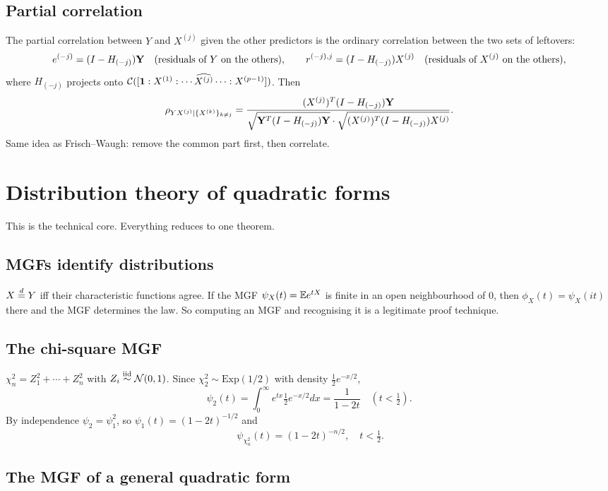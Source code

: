 \documentclass[11pt]{article}
\begin{document}
\subsection{Partial correlation}

The partial correlation between $Y$ and $X^{(j)}$ given the other predictors is the ordinary
correlation between the two sets of leftovers:
\[
  e^{(-j)}=(I-H_{(-j)})\mathbf{Y} \quad\text{(residuals of $Y$ on the others)},\qquad
  r^{(-j),j}=(I-H_{(-j)})X^{(j)} \quad\text{(residuals of $X^{(j)}$ on the others)},
\]
where $H_{(-j)}$ projects onto $\mathcal{C}([\mathbf{1}:X^{(1)}:\cdots\widehat{X^{(j)}}\cdots:X^{(p-1)}])$. Then
\[
  \rho_{Y X^{(j)}\mid \{X^{(k)}\}_{k\ne j}}
  =\frac{(X^{(j)})^T(I-H_{(-j)})\mathbf{Y}}
        {\sqrt{\mathbf{Y}^T(I-H_{(-j)})\mathbf{Y}}\cdot\sqrt{(X^{(j)})^T(I-H_{(-j)})X^{(j)}}} .
\]
Same idea as Frisch--Waugh: remove the common part first, then correlate.

\section{Distribution theory of quadratic forms}

This is the technical core. Everything reduces to one theorem.

\subsection{MGFs identify distributions}

$X\overset{d}{=} Y$ iff their characteristic functions agree. If the MGF
$\psi_X(t)=\mathbb{E} e^{tX}$ is finite in an open neighbourhood of $0$, then
$\phi_X(t)=\psi_X(it)$ there and the MGF determines the law. So computing an MGF and
recognising it is a legitimate proof technique.

\subsection{The chi-square MGF}

$\chi^2_n = Z_1^2+\cdots+Z_n^2$ with $Z_i\overset{\text{iid}}{\sim}\mathcal{N}(0,1)$. Since $\chi^2_2\sim\text{Exp}(1/2)$
with density $\tfrac12 e^{-x/2}$,
\[
  \psi_2(t)=\int_0^\infty e^{tx}\tfrac12e^{-x/2}dx=\frac{1}{1-2t}\quad (t<\tfrac12).
\]
By independence $\psi_2=\psi_1^2$, so $\psi_1(t)=(1-2t)^{-1/2}$ and
\[
  \boxed{\ \psi_{\chi^2_n}(t)=(1-2t)^{-n/2},\quad t<\tfrac12 .}
\]

\subsection{The MGF of a general quadratic form}
\end{document}
